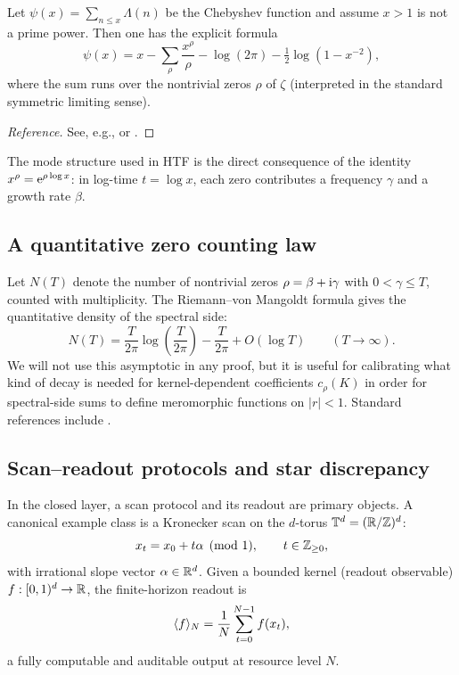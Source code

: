 \begin{proposition}
\label{prop:psi_explicit_formula}
Let $\psi(x)=\sum_{n\le x}\Lambda(n)$ be the Chebyshev function and assume $x>1$ is not a prime power.
Then one has the explicit formula
\[
\psi(x)=x-\sum_{\rho}\frac{x^\rho}{\rho}-\log(2\pi)-\tfrac12\log(1-x^{-2}),
\]
where the sum runs over the nontrivial zeros $\rho$ of $\zeta$ (interpreted in the standard symmetric limiting sense).
\end{proposition}

\begin{proof}[Reference]
See, e.g., \cite[Ch.\ 14]{Titchmarsh1986} or \cite[Ch.\ 1]{Edwards1974}.
\end{proof}

The mode structure used in HTF is the direct consequence of the identity $x^\rho=\mathrm{e}^{\rho\log x}$: in log-time $t=\log x$, each zero contributes a frequency $\gamma$ and a growth rate $\beta$.

\subsection{A quantitative zero counting law}
\label{sec:zero_counting}

Let $N(T)$ denote the number of nontrivial zeros $\rho=\beta+\mathrm{i}\gamma$ with $0<\gamma\le T$, counted with multiplicity.
The Riemann--von Mangoldt formula gives the quantitative density of the spectral side:
\[
N(T)=\frac{T}{2\pi}\log\!\left(\frac{T}{2\pi}\right)-\frac{T}{2\pi}+O(\log T)
\qquad (T\to\infty).
\]
We will not use this asymptotic in any proof, but it is useful for calibrating what kind of decay is needed for kernel-dependent coefficients $c_\rho(K)$ in order for spectral-side sums to define meromorphic functions on $|r|<1$.
Standard references include \cite{Titchmarsh1986,Edwards1974}.

\subsection{Scan--readout protocols and star discrepancy}
\label{sec:scan_discrepancy}

In the closed layer, a scan protocol and its readout are primary objects.
A canonical example class is a Kronecker scan on the $d$-torus $\mathbb{T}^d=(\mathbb{R}/\mathbb{Z})^d$:
\[
x_t=x_0+t\alpha \pmod{1},
\qquad t\in\mathbb{Z}_{\ge 0},
\]
with irrational slope vector $\alpha\in\mathbb{R}^d$.
Given a bounded kernel (readout observable) $f:[0,1)^d\to\mathbb{R}$, the finite-horizon readout is
\[
\langle f \rangle_N=\frac{1}{N}\sum_{t=0}^{N-1} f(x_t),
\]
a fully computable and auditable output at resource level $N$.

